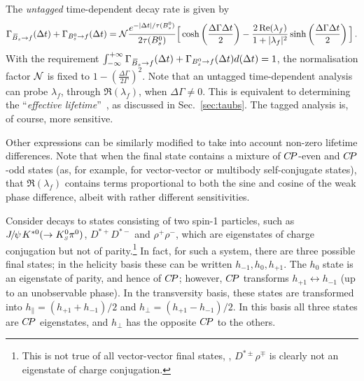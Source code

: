 The {\it untagged} time-dependent decay rate is given by
\begin{equation}
  \Gamma_{\Bsb \to f} (\Delta t) + \Gamma_{\Bs \to f} (\Delta t)
  = 
  {\cal N} %
  \frac{e^{-| \Delta t | / \tau(\Bs)}}{2\tau(\Bs)}
  \Big[ 
  \cosh\left(\frac{\Delta \Gamma \Delta t}{2}\right) -
  \frac{2\, \Re(\lambda_f)}{1 + |\lambda_f|^2} \sinh\left(\frac{\Delta \Gamma \Delta t}{2}\right)
  \Big] \, .
\end{equation}
With the requirement
$\int_{-\infty}^{+\infty} \Gamma_{\kern 0.18em\overline{\kern -0.18em B}{}_s \to f} (\Delta t) + \Gamma_{B^0_s \to f} (\Delta t) d(\Delta t) = 1$,
the normalisation factor ${\cal N}$ 
is fixed to $1 - (\frac{\Delta \Gamma}{2\Gamma})^2$.
Note that an untagged time-dependent analysis can probe
$\lambda_f$, through $\Re(\lambda_f)$, when $\Delta \Gamma \neq 0$.
This is equivalent to determining the ``{\it effective lifetime}''~\cite{Fleischer:2011cw}, as discussed in Sec.~\ref{sec:taubs}.
The tagged analysis is, of course, more sensitive.

Other expressions can be similarly modified to take into account 
non-zero lifetime differences.
Note that when the final state contains 
a mixture of $C\!P$-even and $C\!P$-odd states
(as, for example, for vector-vector or multibody self-conjugate states),
that $\Re(\lambda_f)$ contains terms proportional to 
both the sine and cosine of the weak phase difference, 
albeit with rather different sensitivities.

\label{sec:cp_uta:notations:vv}

Consider \B decays to states consisting of two spin-1 particles,
such as ${J\mskip -3mu/\mskip -2mu\psi\mskip 2mu} K^{*0}(\to K^0_{\scriptscriptstyle S}\pi^0)$, $D^{*+}D^{*-}$ and $\rho^+\rho^-$,
which are eigenstates of charge conjugation but not of parity.\footnote{
  \noindent
  This is not true of all vector-vector final states,
  \eg, $D^{*\pm}\rho^{\mp}$ is clearly not an eigenstate of 
  charge conjugation.
}
In fact, for such a system, there are three possible final states;
in the helicity basis these can be written $h_{-1}, h_0, h_{+1}$.
The $h_0$ state is an eigenstate of parity, and hence of $C\!P$;
however, $C\!P$ transforms $h_{+1} \leftrightarrow h_{-1}$ (up to 
an unobservable phase). In the transversity basis, these states 
are transformed into  $h_\parallel =  (h_{+1} + h_{-1})/2$ and 
$h_\perp = (h_{+1} - h_{-1})/2$.
In this basis all three states are $C\!P$ eigenstates, 
and $h_\perp$ has the opposite $C\!P$ to the others.

